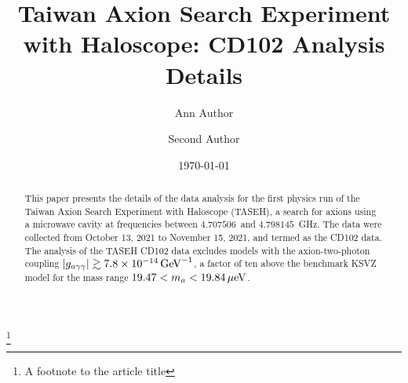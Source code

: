\documentclass[%
preprint, %
 amsmath,amssymb,
 aps,
]{revtex4-2}
\newcommand{\gagg}{\ensuremath{\left|g_{a\gamma\gamma}\right|}}
\newcommand{\ma}{\ensuremath{m_a}}
\newcommand{\muevcc}{\ensuremath{\,\mu\text{e\hspace{-.08em}V}}}
\newcommand{\GeVinv}{\ensuremath{\,\text{Ge\hspace{-.08em}V}^{-1}}}
\newcommand{\flo}{\ensuremath{4.707506}}
\newcommand{\fhi}{\ensuremath{4.798145}}
\newcommand{\mlo}{\ensuremath{19.47}}
\newcommand{\mhi}{\ensuremath{19.84}}
\newcommand{\avelimit}{\ensuremath{7.8\times 10^{-14}}}
\begin{document}

\title{Taiwan Axion Search Experiment with Haloscope: CD102 Analysis Details}%
\thanks{A footnote to the article title}%

\author{Ann Author}
\author{Second Author}%
%



\date{\today}%

\begin{abstract}

This paper presents the details of the data analysis for the first physics 
run of the Taiwan Axion Search Experiment with Haloscope (TASEH), 
a search for axions 
using a microwave cavity at frequencies between \flo\ and \fhi~GHz. 
The data were collected from October 13, 2021 to November 15, 2021, and 
termed as the CD102 data. The analysis of the TASEH CD102 data excludes 
models with the axion-two-photon coupling 
$\gagg\gtrsim \avelimit\GeVinv$, a factor of ten above the benchmark 
KSVZ model for the mass range $\mlo < \ma < \mhi \muevcc$. 


\end{abstract}
\end{document}
